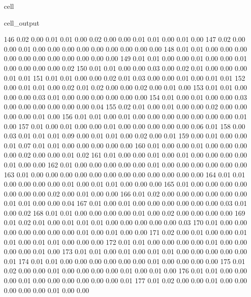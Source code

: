 \documentclass[letterpaper,10pt,french]{sphinxmanual}
\begin{document}
\begin{sphinxuseclass}{cell}
\begin{sphinxuseclass}{cell_output}
\begin{sphinxVerbatim}[commandchars=\\\{\}]
       146	0.02 	0.00 	0.01 	0.01 	0.00 	0.02 	0.00 	0.00 	0.01 	0.01 	0.00 	0.01 	0.00
       147	0.02 	0.00 	0.00 	0.01 	0.00 	0.00 	0.00 	0.00 	0.00 	0.00 	0.00 	0.00 	0.00
       148	0.01 	0.01 	0.00 	0.00 	0.00 	0.00 	0.00 	0.00 	0.00 	0.00 	0.00 	0.00 	0.00
       149	0.01 	0.01 	0.00 	0.00 	0.01 	0.00 	0.00 	0.01 	0.00 	0.00 	0.00 	0.00 	0.02
       150	0.01 	0.01 	0.00 	0.00 	0.03 	0.00 	0.02 	0.01 	0.00 	0.00 	0.00 	0.01 	0.01
       151	0.01 	0.01 	0.00 	0.00 	0.02 	0.01 	0.03 	0.00 	0.00 	0.01 	0.00 	0.01 	0.01
       152	0.00 	0.01 	0.01 	0.00 	0.02 	0.01 	0.02 	0.00 	0.00 	0.02 	0.00 	0.01 	0.00
       153	0.01 	0.01 	0.00 	0.00 	0.00 	0.03 	0.01 	0.00 	0.00 	0.00 	0.00 	0.00 	0.00
       154	0.01 	0.00 	0.01 	0.00 	0.00 	0.03 	0.00 	0.00 	0.00 	0.00 	0.00 	0.00 	0.04
       155	0.02 	0.01 	0.00 	0.01 	0.00 	0.00 	0.02 	0.00 	0.00 	0.00 	0.00 	0.01 	0.00
       156	0.01 	0.01 	0.00 	0.01 	0.00 	0.00 	0.00 	0.00 	0.00 	0.00 	0.00 	0.01 	0.00
       157	0.01 	0.00 	0.01 	0.00 	0.00 	0.01 	0.00 	0.00 	0.00 	0.00 	0.00 	0.06 	0.01
       158	0.00 	0.03 	0.01 	0.01 	0.01 	0.09 	0.00 	0.01 	0.01 	0.00 	0.02 	0.00 	0.01
       159	0.00 	0.01 	0.00 	0.00 	0.01 	0.07 	0.01 	0.01 	0.00 	0.00 	0.00 	0.00 	0.00
       160	0.01 	0.00 	0.00 	0.01 	0.00 	0.00 	0.00 	0.00 	0.02 	0.00 	0.00 	0.01 	0.02
       161	0.01 	0.00 	0.00 	0.01 	0.00 	0.01 	0.00 	0.00 	0.00 	0.00 	0.01 	0.00 	0.00
       162	0.01 	0.00 	0.00 	0.00 	0.00 	0.00 	0.01 	0.00 	0.00 	0.00 	0.00 	0.00 	0.00
       163	0.01 	0.00 	0.00 	0.00 	0.00 	0.00 	0.00 	0.00 	0.00 	0.00 	0.00 	0.00 	0.00
       164	0.01 	0.01 	0.00 	0.00 	0.00 	0.00 	0.01 	0.00 	0.01 	0.01 	0.00 	0.00 	0.00
       165	0.01 	0.00 	0.00 	0.00 	0.00 	0.00 	0.00 	0.00 	0.02 	0.00 	0.01 	0.00 	0.00
       166	0.01 	0.02 	0.00 	0.00 	0.00 	0.00 	0.00 	0.00 	0.01 	0.01 	0.00 	0.00 	0.04
       167	0.01 	0.00 	0.01 	0.00 	0.00 	0.00 	0.00 	0.00 	0.00 	0.03 	0.01 	0.00 	0.02
       168	0.01 	0.01 	0.00 	0.00 	0.00 	0.00 	0.01 	0.00 	0.02 	0.00 	0.00 	0.00 	0.00
       169	0.01 	0.02 	0.01 	0.00 	0.01 	0.01 	0.01 	0.00 	0.00 	0.00 	0.00 	0.00 	0.03
       170	0.01 	0.00 	0.00 	0.00 	0.00 	0.00 	0.00 	0.00 	0.01 	0.00 	0.01 	0.00 	0.00
       171	0.02 	0.00 	0.01 	0.00 	0.00 	0.01 	0.01 	0.00 	0.01 	0.01 	0.00 	0.00 	0.00
       172	0.01 	0.01 	0.00 	0.00 	0.00 	0.00 	0.01 	0.00 	0.00 	0.00 	0.00 	0.01 	0.00
       173	0.01 	0.01 	0.00 	0.01 	0.00 	0.01 	0.01 	0.00 	0.00 	0.00 	0.00 	0.00 	0.01
       174	0.01 	0.01 	0.00 	0.00 	0.00 	0.00 	0.00 	0.00 	0.01 	0.00 	0.00 	0.00 	0.00
       175	0.01 	0.02 	0.00 	0.00 	0.01 	0.00 	0.00 	0.00 	0.00 	0.01 	0.00 	0.01 	0.00
       176	0.01 	0.01 	0.00 	0.00 	0.00 	0.01 	0.00 	0.00 	0.00 	0.00 	0.00 	0.00 	0.01
       177	0.01 	0.02 	0.00 	0.00 	0.01 	0.00 	0.00 	0.00 	0.00 	0.00 	0.01 	0.00 	0.00
\end{sphinxVerbatim}

\end{sphinxuseclass}
\end{sphinxuseclass}
\end{document}

